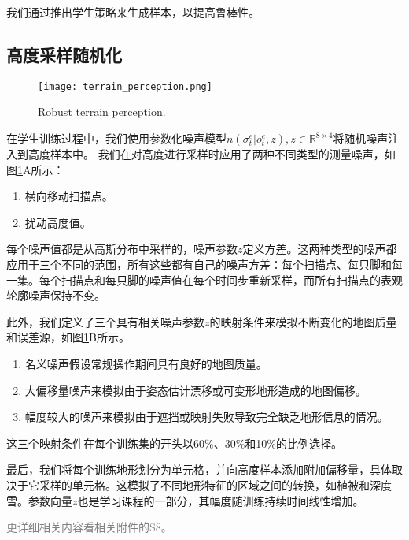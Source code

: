 我们通过推出学生策略来生成样本，以提高鲁棒性\cite[p]{Ross_Gordon_Bagnell_2010,Czarnecki_Pascanu_Osindero_Jayakumar_Swirszcz_Jaderberg_2019}。

\subsection[高度采样随机化]{高度采样随机化}

\begin{figure}
  \centering
  \texttt{[image: terrain\_perception.png]}
  \caption{Robust terrain perception\cite[p10]{Miki_Lee_Hwangbo_Wellhausen_Koltun_Hutter_2022}.}
  \label{fig:terrain_perception}
\end{figure}

在学生训练过程中，我们使用参数化噪声模型$n(\sigma_t^e|o_t^e,z),z\in \mathbb{R}^{8\times 4}$将随机噪声注入到高度样本中。
我们在对高度进行采样时应用了两种不同类型的测量噪声，如图\ref{fig:terrain_perception}A所示：
\begin{enumerate}
  \item 横向移动扫描点。
  \item 扰动高度值。
\end{enumerate}

每个噪声值都是从高斯分布中采样的，噪声参数$z$定义方差。这两种类型的噪声都应用于三个不同的范围，所有这些都有自己的噪声方差：每个扫描点、每只脚和每一集。每个扫描点和每只脚的噪声值在每个时间步重新采样，而所有扫描点的表观轮廓噪声保持不变。

此外，我们定义了三个具有相关噪声参数$z$的映射条件来模拟不断变化的地图质量和误差源，如图\ref{fig:terrain_perception}B所示。
\begin{enumerate}
  \item 名义噪声假设常规操作期间具有良好的地图质量。
  \item 大偏移量噪声来模拟由于姿态估计漂移或可变形地形造成的地图偏移。
  \item 幅度较大的噪声来模拟由于遮挡或映射失败导致完全缺乏地形信息的情况。
\end{enumerate}

这三个映射条件在每个训练集的开头以60\%、30\%和10\%的比例选择。

最后，我们将每个训练地形划分为单元格，并向高度样本添加附加偏移量，具体取决于它采样的单元格。这模拟了不同地形特征的区域之间的转换，如植被和深度雪。参数向量$z$也是学习课程的一部分，其幅度随训练持续时间线性增加。

\textcolor{gray}{\small 更详细相关内容看相关附件的S8。}

